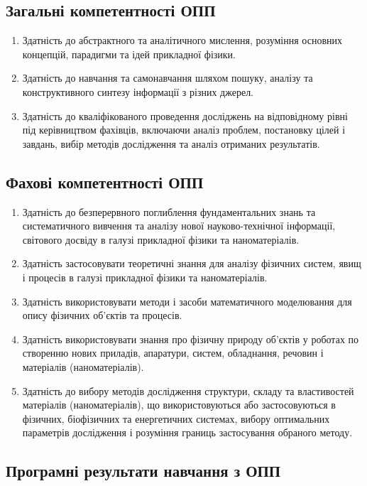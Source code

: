 \documentclass{Syllabus}
\begin{document}
\subsection*{Загальні компетентності ОПП}

\begin{enumerate}
	\item [ЗК 1:] Здатність до абстрактного та аналітичного мислення, розуміння основних концепцій, парадигми та ідей прикладної фізики.
	\item [ЗК 2:] Здатність до навчання та самонавчання шляхом пошуку, аналізу та конструктивного синтезу інформації з різних джерел.
	\item [ЗК 8:] Здатність до кваліфікованого проведення досліджень на відповідному рівні під керівництвом фахівців, включаючи аналіз проблем, постановку цілей і завдань, вибір методів дослідження та аналіз отриманих результатів.
\end{enumerate}

\subsection*{Фахові компетентності ОПП}

\begin{enumerate}
	\item [ФК 2:] Здатність до безперервного поглиблення фундаментальних знань та систематичного вивчення та аналізу нової науково-технічної інформації, світового досвіду в галузі прикладної фізики та наноматеріалів.
	\item [ФК 3:] Здатність застосовувати теоретичні знання для аналізу фізичних систем, явищ і процесів в галузі прикладної фізики та наноматеріалів.
	\item [ФК 8:] Здатність використовувати методи і засоби математичного моделювання для опису фізичних об'єктів та процесів.
	\item [ФК 9:] Здатність використовувати знання про фізичну природу об'єктів у роботах по створенню нових приладів, апаратури, систем, обладнання, речовин і матеріалів (наноматеріалів).
	\item [ФК 11:] Здатність до вибору методів дослідження структури, складу та властивостей матеріалів (наноматеріалів), що використовуються або застосовуються в фізичних, біофізичних та енергетичних системах, вибору оптимальних параметрів дослідження і розуміння границь застосування обраного методу.
\end{enumerate}

\subsection*{Програмні результати навчання з ОПП}
\end{document}
